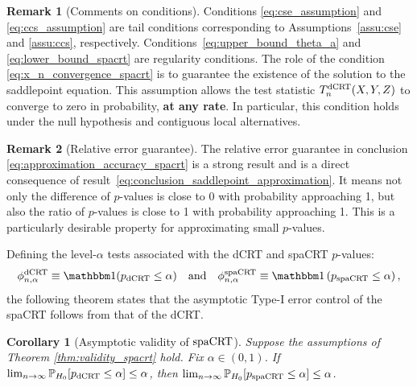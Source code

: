 \documentclass[12pt]{article}
\newtheorem{corollary}{Corollary}
\theoremstyle{definition}
\newtheorem{remark}{Remark}
\def\P{\mathbb{P}}
\def\P{\mathbb{P}}
\renewcommand{\P}{\mathbb{P}}							%
\newcommand{\indicator}{\mathbbm 1}						%
\newcommand{\srx}{X}									%
\newcommand{\srz}{Z}									%
\newcommand{\sry}{Y}									%
\newcommand{\dCRT}{\textnormal{dCRT}} 					%
\newcommand{\spacrt}{\textnormal{spaCRT}}               %
\begin{document}
  \begin{remark}[Comments on conditions]\label{rmk:cutoff-regime}
    Conditions \eqref{eq:cse_assumption} and \eqref{eq:ccs_assumption} are tail conditions corresponding to Assumptions~\ref{assu:cse} and \ref{assu:ccs}, respectively. Conditions~\eqref{eq:upper_bound_theta_a} and \eqref{eq:lower_bound_spacrt} are regularity conditions. The role of the condition \eqref{eq:x_n_convergence_spacrt} is to guarantee the existence of the solution to the saddlepoint equation. This assumption allows the test statistic $T_n^{\dCRT}(\srx,\sry,\srz)$ to converge to zero in probability, \textbf{at any rate}. In particular, this condition holds under the null hypothesis and contiguous local alternatives.
  \end{remark}
  
  
  \begin{remark}[Relative error guarantee]
	  The relative error guarantee in conclusion \eqref{eq:approximation_accuracy_spacrt} is a strong result and is a direct consequence of result~\eqref{eq:conclusion_saddlepoint_approximation}. It means not only the difference of $p$-values is close to $0$ with probability approaching 1, but also the ratio of $p$-values is close to 1 with probability approaching 1. This is a particularly desirable property for approximating small $p$-values.
  \end{remark}
  
  Defining the level-$\alpha$ tests associated with the dCRT and spaCRT $p$-values:
  \begin{align*}
  \phi^{\dCRT}_{n,\alpha} \equiv \indicator(p_{\dCRT} \leq \alpha) \quad \text{and} \quad	\phi^{\spacrt}_{n,\alpha}\equiv \indicator\left(p_{\spacrt} \leq \alpha\right),
  \end{align*}
  the following theorem states that the asymptotic Type-I error control of the spaCRT follows from that of the dCRT.
  
  \begin{corollary}[Asymptotic validity of $\spacrt$]\label{cor:asymptotic_validity_spacrt}
	Suppose the assumptions of Theorem \ref{thm:validity_spacrt} hold. Fix $\alpha\in (0,1)$. If $\lim_{n\rightarrow\infty}\P_{H_0}[p_{\dCRT}\leq \alpha]\leq \alpha$, then $\lim_{n\rightarrow\infty}\P_{H_0}[p_{\spacrt}\leq \alpha]\leq \alpha$.
  \end{corollary}
\end{document}
